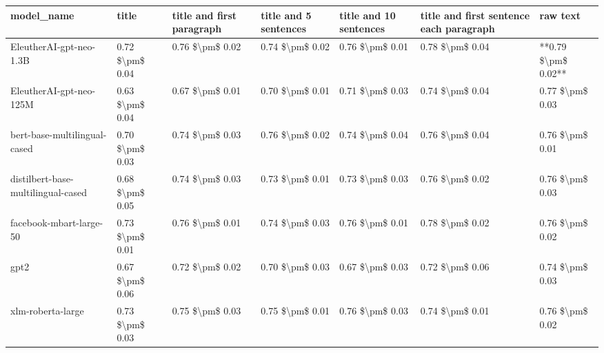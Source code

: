 \begin{tabular}{lllllll}
\toprule
                        model\_name &           title & title and first paragraph & title and 5 sentences & title and 10 sentences & title and first sentence each paragraph &            raw text \\
\midrule
           EleutherAI-gpt-neo-1.3B & 0.72 \$\textbackslash pm\$ 0.04 &           0.76 \$\textbackslash pm\$ 0.02 &       0.74 \$\textbackslash pm\$ 0.02 &        0.76 \$\textbackslash pm\$ 0.01 &                         0.78 \$\textbackslash pm\$ 0.04 & **0.79 \$\textbackslash pm\$ 0.02** \\
           EleutherAI-gpt-neo-125M & 0.63 \$\textbackslash pm\$ 0.04 &           0.67 \$\textbackslash pm\$ 0.01 &       0.70 \$\textbackslash pm\$ 0.01 &        0.71 \$\textbackslash pm\$ 0.03 &                         0.74 \$\textbackslash pm\$ 0.04 &     0.77 \$\textbackslash pm\$ 0.03 \\
      bert-base-multilingual-cased & 0.70 \$\textbackslash pm\$ 0.03 &           0.74 \$\textbackslash pm\$ 0.03 &       0.76 \$\textbackslash pm\$ 0.02 &        0.74 \$\textbackslash pm\$ 0.04 &                         0.76 \$\textbackslash pm\$ 0.04 &     0.76 \$\textbackslash pm\$ 0.01 \\
distilbert-base-multilingual-cased & 0.68 \$\textbackslash pm\$ 0.05 &           0.74 \$\textbackslash pm\$ 0.03 &       0.73 \$\textbackslash pm\$ 0.01 &        0.73 \$\textbackslash pm\$ 0.03 &                         0.76 \$\textbackslash pm\$ 0.02 &     0.76 \$\textbackslash pm\$ 0.03 \\
           facebook-mbart-large-50 & 0.73 \$\textbackslash pm\$ 0.01 &           0.76 \$\textbackslash pm\$ 0.01 &       0.74 \$\textbackslash pm\$ 0.03 &        0.76 \$\textbackslash pm\$ 0.01 &                         0.78 \$\textbackslash pm\$ 0.02 &     0.76 \$\textbackslash pm\$ 0.02 \\
                              gpt2 & 0.67 \$\textbackslash pm\$ 0.06 &           0.72 \$\textbackslash pm\$ 0.02 &       0.70 \$\textbackslash pm\$ 0.03 &        0.67 \$\textbackslash pm\$ 0.03 &                         0.72 \$\textbackslash pm\$ 0.06 &     0.74 \$\textbackslash pm\$ 0.03 \\
                 xlm-roberta-large & 0.73 \$\textbackslash pm\$ 0.03 &           0.75 \$\textbackslash pm\$ 0.03 &       0.75 \$\textbackslash pm\$ 0.01 &        0.76 \$\textbackslash pm\$ 0.03 &                         0.74 \$\textbackslash pm\$ 0.01 &     0.76 \$\textbackslash pm\$ 0.02 \\
\bottomrule
\end{tabular}
